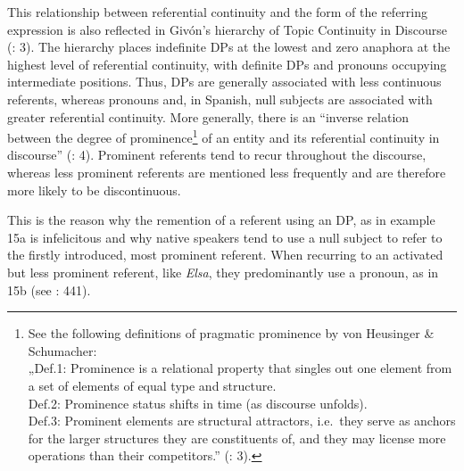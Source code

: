\documentclass[
  letterpaper,
  DIV=11,
  numbers=noendperiod]{scrartcl}
\begin{document}
This relationship between referential continuity and the form of the
referring expression is also reflected in Givón's hierarchy of Topic
Continuity in Discourse (: 3). The
hierarchy places indefinite DPs at the lowest and zero anaphora at the
highest level of referential continuity, with definite DPs and pronouns
occupying intermediate positions. Thus, DPs are generally associated
with less continuous referents, whereas pronouns and, in Spanish, null
subjects are associated with greater referential continuity. More
generally, there is an ``inverse relation between the degree of
prominence\footnote{See the following definitions of pragmatic
  prominence by von Heusinger \& Schumacher:\\
  „Def.1: Prominence is a relational property that singles out one
  element from a set of elements of equal type and structure.\\
  Def.2: Prominence status shifts in time (as discourse unfolds).\\
  Def.3: Prominent elements are structural attractors, i.e.~they serve
  as anchors for the larger structures they are constituents of, and
  they may license more operations than their competitors.''
  (: 3).} of an entity and its referential continuity
in discourse'' (: 4). Prominent referents tend to recur throughout
the discourse, whereas less prominent referents are mentioned less
frequently and are therefore more likely to be discontinuous.

This is the reason why the remention of a referent using an DP, as in
example 15a is infelicitous and why native speakers tend to use a null
subject to refer to the firstly introduced, most prominent referent.
When recurring to an activated but less prominent referent, like
\emph{Elsa}, they predominantly use a pronoun, as in 15b (see
: 441).
\end{document}
